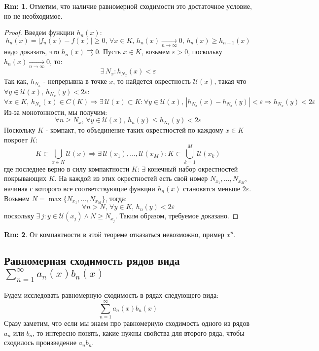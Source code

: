 \documentclass[12pt]{article}
\newcommand{\MU}{\mathcal{U}}
\newcommand{\VE}{\varepsilon}
\theoremstyle{definition}
\newtheorem{rem}{Rm:}
\newcommand{\ddsum}[2]{\displaystyle\sum\limits_{#1}^{#2}}
\newcommand{\uconv}[1]{\overset{#1}{\rightrightarrows}}
\begin{document}
\begin{rem}
	Отметим, что наличие равномерной сходимости это достаточное условие, но не необходимое.  
\end{rem}
\begin{proof}
	Введем функции $h_n(x)$:
	$$
		h_n(x) = |f_n(x) - f(x)| \geq 0, \,  \forall x \in K, \, h_n(x) \xrightarrow[n \to \infty]{} 0, \, h_n(x) \geq h_{n+1}(x)
	$$
	надо доказать, что $h_n(x) \uconv{} 0$. Пусть $x \in K$, возьмем $\VE> 0$, поскольку $h_n(x) \xrightarrow[n \to \infty]{} 0$, то:
	$$
		\exists \, N_x \colon h_{N_x}(x) < \VE
	$$
	Так как, $h_{N_x}$ - непрерывна в точке $x$, то найдется окрестность $\MU(x)$, такая что $\forall y \in \MU(x), \, h_{N_x}(y) < 2\VE$:
	$$
		\forall x \in K, \, h_{N_x}(x) \in C(K) \Rightarrow \exists \, \MU(x) \subset K \colon \forall y \in \MU(x), \, |h_{N_x}(x) - h_{N_x}(y)| < \VE \Rightarrow h_{N_x}(y) < 2\VE
	$$
	Из-за монотонности, мы получим:
	$$
		\forall n \geq N_x, \, \forall y \in \MU(x), \, h_n(y) \leq h_{N_x}(y) < 2\VE 
	$$
	Поскольку $K$ - компакт, то объединение таких окрестностей по каждому $x \in K$ покроет $K$:
	$$
		K \subset \bigcup\limits_{x \in K} \MU(x) \Rightarrow \exists \, \MU(x_1), \dotsc, \MU(x_M) \colon K \subset \bigcup\limits_{k = 1}^M \MU(x_k)
	$$
	где последнее верно в силу компактности $K$: $\exists$ конечный набор окрестностей покрывающих $K$. На каждой из этих окрестностей есть свой номер $N_{x_1}, \dotsc, N_{x_M}$, начиная с которого все соответствующие функции $h_n(x)$ становятся меньше $2\VE$. Возьмем $N = \max\{N_{x_1}, \dotsc, N_{x_M}\}$, тогда:
	$$
		\forall n > N, \, \forall y \in K, \, h_n(y) < 2\VE
	$$
	поскольку $\exists \, j \colon y \in \MU(x_j) \wedge N \geq N_{x_j}$. Таким образом, требуемое доказано.
\end{proof}
\begin{rem}
	От компактности в этой теореме отказаться невозможно, пример $x^n$.
\end{rem}

\newpage
\subsection*{Равномерная сходимость рядов вида $\ddsum{n = 1}{\infty}a_n(x)b_n(x)$
}
Будем исследовать равномерную сходимость в рядах следующего вида:
$$
	\ddsum{n = 1}{\infty}a_n(x)b_n(x)
$$
Сразу заметим, что если мы знаем про равномерную сходимость одного из рядов $a_n$ или $b_n$, то интересно понять, какие нужны свойства для второго ряда, чтобы сходилось произведение $a_n b_n$.
\end{document}
